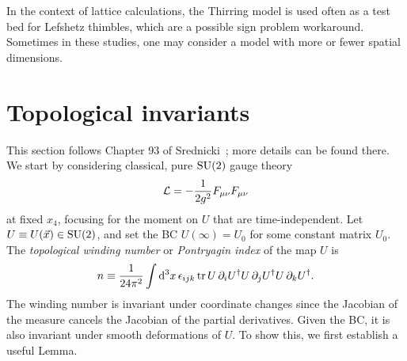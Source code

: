 In the context of lattice calculations, the Thirring model is used often as a
test bed for Lefshetz thimbles, which are a possible sign problem workaround.
Sometimes in these studies, one may consider a model with more or fewer spatial
dimensions.


\section{Topological invariants}\label{sec:topinvar}

This section follows Chapter 93 of Srednicki~\cite{srednicki_quantum_2007};
more details can be found there.
We start by considering classical, pure $\operatorname{SU}(2)$ gauge theory
\begin{equation}\label{eq:topaction}
  \mathcal{L}=-\frac{1}{2g^2}F_{\mu\nu}F_{\mu\nu}
\end{equation}
at fixed $x_4$, focusing for the moment on $U$ that are time-independent.
Let $U\equiv U(\vec{x})\in\operatorname{SU}(2)$, and set the BC $U(\infty)=U_0$
for some constant matrix $U_0$.
The {\it topological winding number}
or {\it Pontryagin index} of the map $U$ is
\begin{equation}\label{eq:wn}
  n\equiv\frac{1}{24\pi^2}\int\dd[3]{x}\epsilon_{ijk}
    \tr U\,\partial_iU^\dagger U\,\partial_jU^\dagger
        U\,\partial_kU^\dagger.
\end{equation}
The winding number is invariant under coordinate changes since the Jacobian of
the measure cancels the Jacobian of the partial derivatives.
Given the BC, it is also invariant under smooth deformations of $U$.
To show this, we first establish a useful Lemma.





